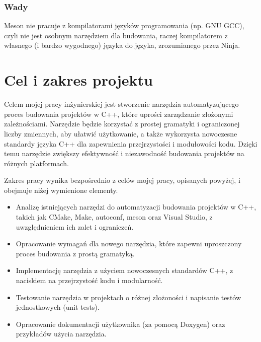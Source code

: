 \subsubsection{Wady}
Meson nie pracuje z kompilatorami języków programowania (np. GNU GCC), czyli nie jest osobnym narzędziem dla budowania, raczej kompilatorem z własnego (i bardzo wygodnego) języka do języka, zrozumianego przez Ninja.

\section{Cel i zakres projektu}
Celem mojej pracy inżynierskiej jest stworzenie narzędzia automatyzującego proces budowania projektów w C++, które uprości zarządzanie złożonymi zależnościami. Narzędzie będzie korzystać z prostej gramatyki i ograniczonej liczby zmiennych, aby ułatwić użytkowanie, a także wykorzysta nowoczesne standardy języka C++ dla zapewnienia przejrzystości i modułowości kodu. Dzięki temu narzędzie zwiększy efektywność i niezawodność budowania projektów na różnych platformach.

Zakres pracy wynika bezpośrednio z celów mojej pracy, opisanych powyżej, i obejmuje niżej wymienione elementy.
\begin{itemize}
    \item Analizę istniejących narzędzi do automatyzacji budowania projektów w C++, takich jak CMake, Make, autoconf, meson oraz Visual Studio, z uwzględnieniem ich zalet i ograniczeń.
    \item Opracowanie wymagań dla nowego narzędzia, które zapewni uproszczony proces budowania z prostą gramatyką.
    \item Implementację narzędzia z użyciem nowoczesnych standardów C++, z naciskiem na przejrzystość kodu i modularność.
    \item Testowanie narzędzia w projektach o różnej złożoności i napisanie testów jednostkowych (unit tests).
    \item Opracowanie dokumentacji użytkownika (za pomocą Doxygen) oraz przykładów użycia narzędzia.
\end{itemize}